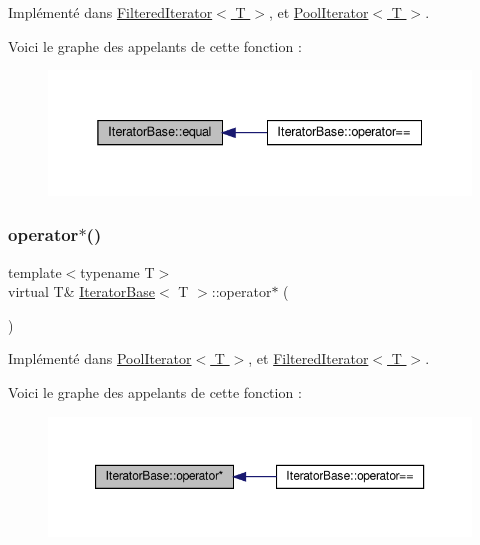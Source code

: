 Implémenté dans \hyperlink{class_filtered_iterator_a7118ec2bba2bf138ca771a394a8d72c8}{Filtered\+Iterator$<$ T $>$}, et \hyperlink{class_pool_iterator_adbbef39e72972414b1bbb6d6bb885bb1}{Pool\+Iterator$<$ T $>$}.

Voici le graphe des appelants de cette fonction \+:
\nopagebreak
\begin{figure}[H]
\begin{center}
\leavevmode
\includegraphics[width=338pt]{class_iterator_base_a08430515a17384d098eb62ecce1b64c6_icgraph}
\end{center}
\end{figure}
\mbox{\label{class_iterator_base_a532583e58bce168648bdbdedb3a7d5ab}} 
\subsubsection{\texorpdfstring{operator$\ast$()}{operator*()}\hspace{0.1cm}{\footnotesize\ttfamily [1/2]}}
{\footnotesize\ttfamily template$<$typename T$>$ \\
virtual T\& \hyperlink{class_iterator_base}{Iterator\+Base}$<$ T $>$\+::operator$\ast$ (\begin{DoxyParamCaption}{ }\end{DoxyParamCaption})\hspace{0.3cm}{\ttfamily [pure virtual]}}



Implémenté dans \hyperlink{class_pool_iterator_a3acdd751b297473d78eedb7422c7a66c}{Pool\+Iterator$<$ T $>$}, et \hyperlink{class_filtered_iterator_ac891b168cd653612ddc7ed7cb4380196}{Filtered\+Iterator$<$ T $>$}.

Voici le graphe des appelants de cette fonction \+:
\nopagebreak
\begin{figure}[H]
\begin{center}
\leavevmode
\includegraphics[width=350pt]{class_iterator_base_a532583e58bce168648bdbdedb3a7d5ab_icgraph}
\end{center}
\end{figure}
\mbox{\label{class_iterator_base_abc219468b68f2b5471494d04d00f6ec7}} 

